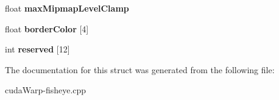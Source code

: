\begin{DoxyCompactItemize}
\item 
float {\bfseries max\+Mipmap\+Level\+Clamp}\hypertarget{structCUDA__TEXTURE__DESC__st_a3f17058fb8f4c7150ad5cd87e5001b85}{}\label{structCUDA__TEXTURE__DESC__st_a3f17058fb8f4c7150ad5cd87e5001b85}

\item 
float {\bfseries border\+Color} \mbox{[}4\mbox{]}\hypertarget{structCUDA__TEXTURE__DESC__st_aff4f315820ea589b86658d38557f5701}{}\label{structCUDA__TEXTURE__DESC__st_aff4f315820ea589b86658d38557f5701}

\item 
int {\bfseries reserved} \mbox{[}12\mbox{]}\hypertarget{structCUDA__TEXTURE__DESC__st_a195c96d75f7b111339b71f889a2b3885}{}\label{structCUDA__TEXTURE__DESC__st_a195c96d75f7b111339b71f889a2b3885}

\end{DoxyCompactItemize}


The documentation for this struct was generated from the following file\+:\begin{DoxyCompactItemize}
\item 
cuda\+Warp-\/fisheye.\+cpp\end{DoxyCompactItemize}
